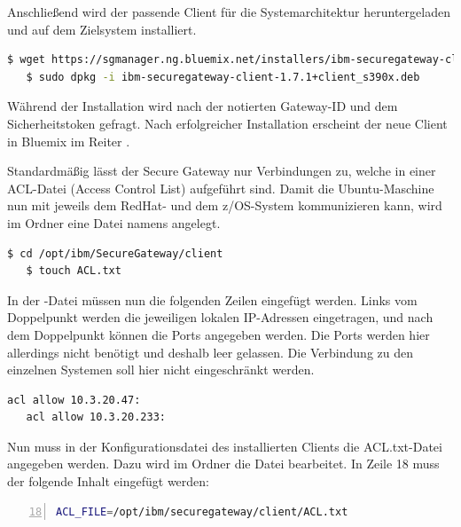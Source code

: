 Anschließend wird der passende Client für die Systemarchitektur heruntergeladen und auf dem Zielsystem installiert.

\begin{lstlisting}[language=bash, caption=Secure Gateway für s390x installieren, label=Secure Gateway s390x installieren]
   $ wget https://sgmanager.ng.bluemix.net/installers/ibm-securegateway-client-1.7.1+client_s390x.deb
   $ sudo dpkg -i ibm-securegateway-client-1.7.1+client_s390x.deb
\end{lstlisting}

Während der Installation wird nach der notierten Gateway-ID und dem Sicherheitstoken gefragt. Nach erfolgreicher Installation
erscheint der neue Client in Bluemix im Reiter .

Standardmäßig lässt der Secure Gateway nur Verbindungen zu, welche in einer ACL-Datei (Access Control List) aufgeführt sind.
Damit die Ubuntu-Maschine nun mit jeweils dem RedHat- und dem z/OS-System kommunizieren kann, wird im Ordner
 eine Datei namens  angelegt.

\begin{lstlisting}[language=bash, caption=ACL-Datei anlegen, label=ACL-Datei anlegen]
   $ cd /opt/ibm/SecureGateway/client
   $ touch ACL.txt
\end{lstlisting}

In der -Datei müssen nun die folgenden Zeilen eingefügt werden. Links vom Doppelpunkt werden die jeweiligen
lokalen IP-Adressen eingetragen, und nach dem Doppelpunkt können die Ports angegeben werden. Die Ports werden hier allerdings
nicht benötigt und deshalb leer gelassen. Die Verbindung zu den einzelnen Systemen soll hier nicht eingeschränkt werden.

\begin{lstlisting}[language=bash, caption=Inhalt der ACL-Datei, label=Inhalt der ACL-Datei]
   acl allow 10.3.20.47:
   acl allow 10.3.20.233:
\end{lstlisting}

Nun muss in der Konfigurationsdatei des installierten Clients die ACL.txt-Datei angegeben werden. Dazu wird im Ordner
 die Datei  bearbeitet. In Zeile 18 muss der folgende Inhalt eingefügt werden:

\begin{lstlisting}[language=bash, numbers=left, firstnumber=18, caption=Konfigurationsdatei anpassen, label=Konfigurationsdatei anpassen]
   ACL_FILE=/opt/ibm/securegateway/client/ACL.txt
\end{lstlisting}

